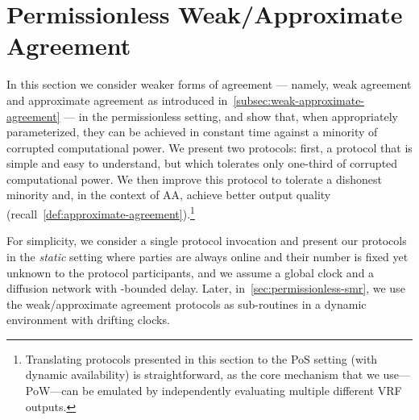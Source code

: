 \section{Permissionless Weak/Approximate Agreement}
\label{sec:reaching-weak-approx-agreement}

In this section we consider weaker forms of agreement --- namely, weak agreement and approximate agreement as introduced in~\cref{subsec:weak-approximate-agreement} --- in the permissionless setting, and show that, when appropriately parameterized, they can be achieved in constant time against a minority of corrupted computational power.
%
We present two protocols: first, a protocol that is simple and easy to understand, but which tolerates only one-third of corrupted computational power.
%
We then improve this protocol to tolerate a dishonest minority and, in the context of AA, achieve better output quality (recall~\cref{def:approximate-agreement}).\footnote{Translating protocols presented in this section to the PoS setting (with dynamic availability) is straightforward, as the core mechanism that we use---\mforone PoW---can be emulated by independently evaluating multiple different VRF outputs.}

For simplicity, we consider a single protocol invocation and present our protocols in the \emph{static} setting where parties are always online and their number is fixed yet unknown to the protocol participants, and we assume a global clock and a diffusion network with \delay-bounded delay.
%
Later, in~\cref{sec:permissionless-smr}, we use the weak/approximate agreement protocols as sub-routines in a dynamic environment with drifting clocks.




